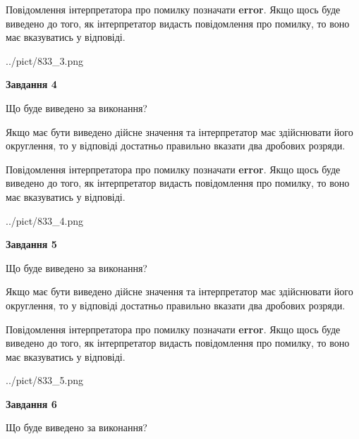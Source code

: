 \documentclass[12pt, ukrainian]{article}
\begin{document}
{\begin {Large}
Повідомлення інтерпретатора про помилку позначати \textbf{error}.
Якщо щось буде виведено до того, як інтерпретатор видасть повідомлення про помилку, 
то воно має вказуватись у відповіді. \par

\begin{center}
	{../pict/833_3.png}
\end{center}
\newpage

{\begin {center}\textbf{Завдання 4}\end {center}}\par
Що буде виведено за виконання? \par

Якщо має бути виведено дійсне значення та інтерпретатор має здійснювати його округлення, 
то у відповіді достатньо правильно вказати два дробових розряди.

Повідомлення інтерпретатора про помилку позначати \textbf{error}.
Якщо щось буде виведено до того, як інтерпретатор видасть повідомлення про помилку, 
то воно має вказуватись у відповіді. \par

\begin{center}
	{../pict/833_4.png}
\end{center}
\newpage

{\begin {center}\textbf{Завдання 5}\end {center}}\par
Що буде виведено за виконання? \par

Якщо має бути виведено дійсне значення та інтерпретатор має здійснювати його округлення, 
то у відповіді достатньо правильно вказати два дробових розряди.

Повідомлення інтерпретатора про помилку позначати \textbf{error}.
Якщо щось буде виведено до того, як інтерпретатор видасть повідомлення про помилку, 
то воно має вказуватись у відповіді. \par

\begin{center}
	{../pict/833_5.png}
\end{center}
\newpage

{\begin {center}\textbf{Завдання 6}\end {center}}\par
Що буде виведено за виконання? \par


\end{Large}}
\end{document}
